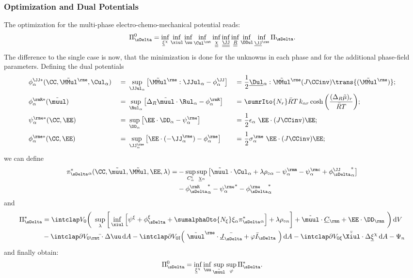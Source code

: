 \subsubsection{Optimization and Dual Potentials} %

  The optimization for the multi-phase electro-chemo-mechanical potential reads:
  \begin{align}
    \PiDeltaO = \inf_{\xichiul} \inf_{\xiul} \inf_{\uu} \inf_{\Ctul} \inf_{\chiull} \inf_{\JJull} \inf_{\Rull} \inf_{\DDul} \inf_{\JJeul}\PiDelta.
  \end{align}
  The difference to the single case is now, that the minimization is done for the unknowns in each phase and for the additional phase-field parameters. Defining the dual potentials
  \begin{alignat}{3}
    &\phiJJs_\alpha(\CC,\MMuletilde,\Cula) \ &=& \ \sup_{\JJula}\big[\MMuletilde:\JJula - \phiJJa \big] \ &=& \ \frac{1}{2}\smash{\Dull}_{\alpha}:\MMuletilde (J\CCinv)\trans{(\MMuletilde)}; \\
    &\phiRs_\alpha(\muultilde) \ &=& \ \sup_{\Rula}\big[\Delta_R \muultilde \cdot \Rula-\phiRa\big] \ &=& \ \sumrIto{N_r} \RT \,k_{\alpha r}\cosh\bigg(\frac{(\Delta_R\tilde\mu)_r}{\RT}\bigg); \\
    &\psies_\alpha(\CC,\EE) \ &=& \ \sup_{\DDa} \big[ \EE\cdot\DDa - \psiea \big] \ &=& \ \frac{1}{2}\epsilon_\alpha \ \EE \cdot (J\CCinv)\EE; \\
    &\phies_\alpha(\CC,\EE) \ &=& \ \sup_{\JJe_\alpha} \big[ \EE\cdot(-\JJe_\alpha) - \phiea \big] \ &=& \ \frac{1}{2} \sigmae_\alpha \ \EE \cdot (J\CCinv)\EE;
  \end{alignat}
  we can define
  \begin{align}
    \begin{split}
    \piDeltaas(\CC,\muultilde,\MMultilde,\EE,\lambda) = &- \sup_{\Cta} \sup_{\chiula} \big[ \muultilde\cdot\Cula+\lambda\rho_{\circ\alpha} - \psima - \psica + \phiJJDeltaas \big] \\
    &- \phiRDeltaas - \psieas - \phieDeltaas 
    \end{split}
  \end{align}
  and
  \begin{align}
    \begin{split}
      \PiDeltas &= \intVO \bigg( \ \sup_{\lambda} \bigg[ \inf_{\xiul} \Big[ \psixi + \phixiDelta + \sumalphaOto{\Nxi} \xia \piDeltaas \Big] + \lambda \rho_{\circ n} \bigg] + \muultilde\cdot\Culn + \EE\cdot\DD_\rmn \ \bigg) \dV  \\ 
      &- \intdVOt \bar\tt\cdot\Delta\uu \dA - \intdVOx{I} \Big( \ \muuletilde \cdot \bar\JulDelta + \varphi \bar I_{\sDelta} \ \Big) \dA - \intdVOx{\xi} \bar\Xiultilde \cdot \Delta \xichiul \dA - \Psi_n
    \end{split}
  \end{align}
  and finally obtain:
  \begin{align}
    \PiDeltaO =  \inf_{\xichiul} \inf_{\uu} \sup_{\muultilde} \sup_{\varphi} \PiDeltas.
  \end{align}

